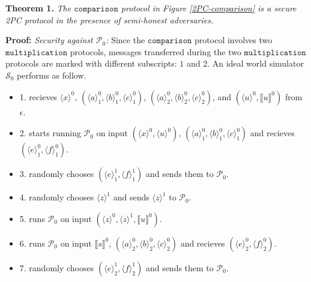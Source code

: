 \documentclass[letterpaper]{article} %
\begin{document}
    \textbf{Theorem 1.}
    \emph{The $\mathtt{comparison}$ protocol in Figure \ref{2PC-comparison} is a secure 2PC protocol
    in the presence of semi-honest adversaries.}

    \textbf{Proof:}
    \emph{Security against $\mathcal{P}_{0}$:}
    Since the $\mathtt{comparison}$ protocol involves two $\mathtt{multiplication}$ protocols,
    messages transferred during the two $\mathtt{multiplication}$ protocols
    are marked with different subscripts: $1$ and $2$.
    An ideal world simulator $\mathcal{S}_{0}$ performs as follow.
    \begin{itemize}
        \item 1. recieves $\langle x\rangle ^{0}$,
        $(\langle a\rangle_{1}^{0},\langle b\rangle_{1}^{0},\langle c\rangle_{1}^{0})$,
        $(\langle a\rangle_{2}^{0},\langle b\rangle_{2}^{0},\langle c\rangle_{2}^{0})$,
        and $(\langle u\rangle ^{0},\llbracket u \rrbracket ^{0})$
        from $\epsilon $.

        \item 2. starts running $\mathcal{P}_{0}$ on input $(\langle x\rangle ^{0},\langle u\rangle ^{0})$,
        $(\langle a\rangle_{1}^{0},\langle b\rangle_{1}^{0},\langle c\rangle_{1}^{0})$
        and recieves $(\langle e\rangle_{1}^{0},\langle f\rangle_{1}^{0})$.

        \item 3. randomly chooses $(\langle e\rangle_{1}^{1},\langle f\rangle_{1}^{1})$ and sends them to $\mathcal{P}_{0}$.

        \item 4. randomly chooses $\langle z\rangle ^{1}$ and sends $\langle z\rangle ^{1}$ to $\mathcal{P}_{0}$.

        \item 5. runs $\mathcal{P}_{0}$ on input $(\langle z\rangle ^{0},\langle z\rangle ^{1},\llbracket u \rrbracket ^{0})$.

        \item 6. runs $\mathcal{P}_{0}$ on input $\llbracket s \rrbracket^{0}$,
        $(\langle a\rangle_{2}^{0},\langle b\rangle_{2}^{0},\langle c\rangle_{2}^{0})$
        and recieves $(\langle e\rangle_{2}^{0},\langle f\rangle_{2}^{0})$.

        \item 7. randomly chooses $(\langle e\rangle_{2}^{1},\langle f\rangle_{2}^{1})$ and sends them to $\mathcal{P}_{0}$.

    \end{itemize}
\end{document}
